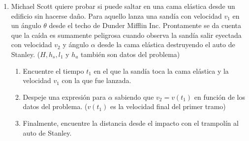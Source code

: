 \documentclass[letterpaper,11pt]{article}
\begin{document}
\begin{enumerate}
\newpage

\item Michael Scott quiere probar si puede saltar en una cama elástica desde un edificio sin hacerse daño. Para aquello lanza una sandía con velocidad $v_1$ en un ángulo $\theta$ desde el techo de Dunder Mifflin Inc. Prontamente se da cuenta que la caída es sumamente peligrosa cuando observa la sandía salir eyectada con velocidad $v_2$ y ángulo $\alpha$ desde la cama elástica destruyendo el auto de Stanley. ($H,h_s,l_1$ y $h_a$ también son datos del problema)

\begin{figure}[H]
    \centering
        \centering
        
\end{figure}

\begin{enumerate}
    \item Encuentre el tiempo $t_1$ en el que la sandía toca la cama elástica y la velocidad $v_1$ con la que fue lanzada. 
    \item Despeje una expresión para $\alpha$ sabiendo que $v_2 = v(t_1)$ en función de los datos del problema. ($v(t_1)$ es la velocidad final del primer tramo)
    \item Finalmente, encuentre la distancia desde el impacto con el trampolín al auto de Stanley.
\end{enumerate}


%   

\end{enumerate}
\end{document}
